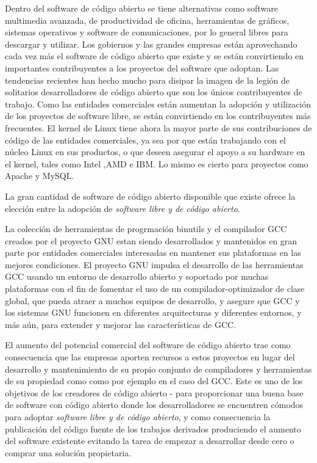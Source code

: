 \documentclass[a4paper,11pt]{article}
\begin{document}
Dentro del software de código abierto se tiene alternativas como software multimedia avanzada, de productividad de oficina,  herramientas de gráficos, sistemas operativos y software de comunicaciones, por lo general libres para descargar y utilizar. Los gobiernos y las grandes empresas están aprovechando cada vez más el software de código abierto que existe y se están convirtiendo en importantes contribuyentes a los proyectos del software que adoptan. Las tendencias recientes han hecho mucho para disipar la imagen de la legión de solitarios desarrolladores de código abierto que son los únicos contribuyentes de trabajo. 
Como las entidades comerciales están aumentan la adopción y utilización de los proyectos de software libre,  se están convirtiendo en los contribuyentes más frecuentes. El kernel de Linux tiene ahora la mayor parte de sus contribuciones de código de las entidades comerciales, ya sea por que están trabajando con el núcleo Linux en sus productos, o que deseen asegurar el apoyo a su hardware en el kernel, tales como Intel ,AMD e IBM. Lo mismo es cierto para proyectos como Apache y MySQL.

La gran cantidad de software de código abierto disponible que existe ofrece la elección entre la adopción de \textit{software libre y de código abierto}. 

La colección de herramientas de progrmación binutils y el compilador GCC creados por el proyecto GNU estan siendo desarrollados y mantenidos en gran parte por entidades comerciales interesadas en mantener sus plataformas en las mejores condiciones. El proyecto GNU impulsa el desarrollo de las herramientas GCC usando un entorno de desarrollo abierto y soportado por muchas plataformas con el fin de fomentar el uso de un compilador-optimizador de clase global, que pueda atraer a muchos equipos de desarrollo, y asegure que GCC y los sistemas GNU funcionen en diferentes arquitecturas y diferentes entornos, y más aún, para extender y mejorar las características de GCC. 

El aumento del potencial comercial del software de código abierto trae como consecuencia que las empresas aporten recursos a estos proyectos en lugar del desarrollo y mantenimiento de su propio conjunto de compiladores y herramientas de su propiedad como como por ejemplo en el caso del GCC. Este es uno de los objetivos de los creadores de código abierto - para proporcionar una buena base de software con código abierto donde los desarrolladores se encuentren cómodos para adoptar  \textit{software libre y de código abierto}, y como consecuencia la publicación del código fuente de los trabajos derivados
produciendo el aumento del software existente evitando la tarea de empezar a desarrollar desde cero o comprar una solución propietaria. 
\end{document}
